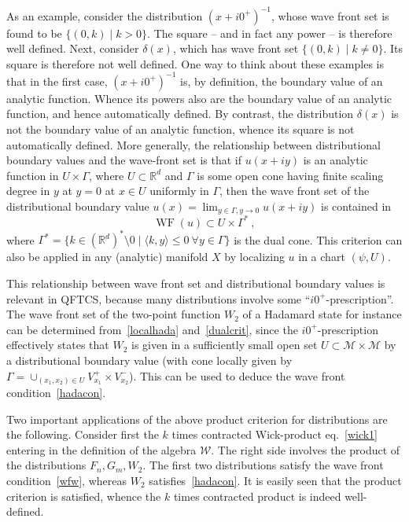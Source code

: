 \documentclass[12pt]{article}
\newcommand{\RR}{\mathbb{R}}
\newcommand{\eW}{\mathscr{W}}
\newcommand{\M}{\mathscr{M}}
\DeclareMathOperator{\WF}{WF}
\theoremstyle{plain}
\theoremstyle{definition}
\def\ben{\begin{equation}}
\def\een{\end{equation}}
\begin{document}
As an example, consider the distribution $(x + i0^+)^{-1}$, whose
wave front set is found to be $\{ (0,k) \mid k > 0 \}$.
The square -- and in fact any power -- is therefore well defined. Next, consider $\delta(x)$, which
has wave front set $\{(0,k) \mid k \neq 0 \}$. Its square is therefore not
well defined. One way to think about these examples is that in the first case,
$(x+i0^+)^{-1}$ is, by definition, the boundary value of an analytic function.
Whence its powers also are the boundary value of an analytic function, and
hence automatically defined. By contrast, the distribution $\delta(x)$ is
not the boundary value of an analytic function, whence its square is
not automatically defined. More generally, the relationship between distributional
boundary values and the wave-front set is that if $u(x+iy)$ is an analytic
function in $U \times \Gamma$, where $U \subset \RR^d$ and $\Gamma$ is some open cone
having finite scaling degree in $y$ at $y=0$ at $x \in U$ uniformly in $\Gamma$, then the wave front
set of the distributional boundary value $u(x) = \lim_{y \in \Gamma, y \to 0} u(x+iy)$
is contained in
\ben\label{dualcrit}
\WF(u) \subset U \times \Gamma^* \ ,
\een
where $\Gamma^* = \{ k \in (\RR^d)^* \setminus 0 \mid \langle k, y \rangle \le 0 \ \forall y \in \Gamma\}$
is the dual cone. This criterion can also be applied in any (analytic) manifold $X$
by localizing $u$ in a chart $(\psi,U)$. 

This relationship between wave front set and distributional boundary values is relevant 
in QFTCS, because many distributions involve some ``$i0^+$-prescription''. 
The wave front set of the two-point function $W_2$ of a Hadamard state for instance can be determined from~\eqref{localhada} and~\eqref{dualcrit}, since the $i0^+$-prescription effectively states that
$W_2$ is given in a sufficiently small open set $U \subset \M \times \M$ by a distributional boundary value (with cone locally given by $\Gamma = \cup_{(x_1,x_2) \in U} V^+_{x_1} \times V^-_{x_2}$). This can be used to deduce the wave front condition~\eqref{hadacon}. 

Two important applications of the above product criterion for distributions are the following.
Consider first the $k$ times contracted Wick-product eq.~\eqref{wick1} entering in the 
definition of the algebra $\eW$. The right side involves the product of the distributions $F_n,
G_m, W_2$. The first two distributions satisfy the wave front condition~\eqref{wfw}, whereas
$W_2$ satisfies~\eqref{hadacon}. It is easily seen that the product criterion is satisfied, 
whence the $k$ times contracted product is indeed well-defined. 
\end{document}
